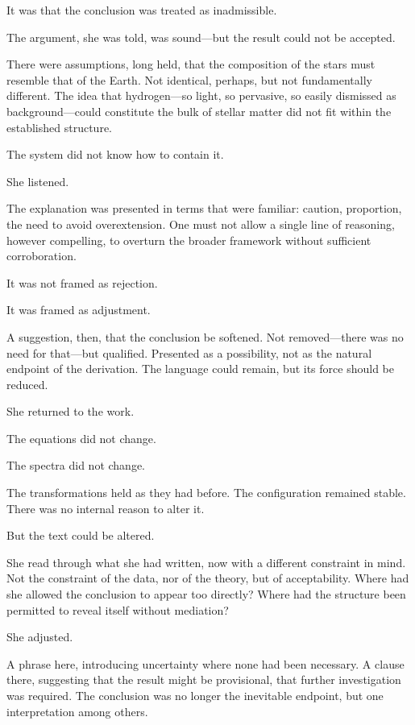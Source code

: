It was that the conclusion was treated as inadmissible.

The argument, she was told, was sound---but the result could not be
accepted.

There were assumptions, long held, that the composition of the
stars must resemble that of the Earth. Not identical, perhaps, but
not fundamentally different. The idea that hydrogen---so light, so
pervasive, so easily dismissed as background---could constitute the
bulk of stellar matter did not fit within the established structure.

The system did not know how to contain it.

She listened.

The explanation was presented in terms that were familiar: caution,
proportion, the need to avoid overextension. One must not allow a
single line of reasoning, however compelling, to overturn the
broader framework without sufficient corroboration.

It was not framed as rejection.

It was framed as adjustment.

A suggestion, then, that the conclusion be softened. Not
removed---there was no need for that---but qualified. Presented as
a possibility, not as the natural endpoint of the derivation. The
language could remain, but its force should be reduced.

\scenebreak

She returned to the work.

The equations did not change.

The spectra did not change.

The transformations held as they had before. The configuration
remained stable. There was no internal reason to alter it.

But the text could be altered.

She read through what she had written, now with a different
constraint in mind. Not the constraint of the data, nor of the
theory, but of acceptability. Where had she allowed the conclusion
to appear too directly? Where had the structure been permitted to
reveal itself without mediation?

She adjusted.

A phrase here, introducing uncertainty where none had been
necessary. A clause there, suggesting that the result might be
provisional, that further investigation was required. The
conclusion was no longer the inevitable endpoint, but one
interpretation among others.

